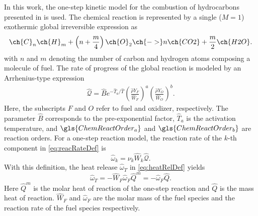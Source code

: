In this work,  the one-step kinetic model for the combustion of hydrocarbons presented in \textcite{fernandez-tarrazoSimpleOnestepChemistry2006} is used. The chemical reaction is represented by a single ($M = 1$)  exothermic global irreversible expression as
\begin{equation}
	\ch{C}_n \ch{H}_m + \left(n+\frac{m}{4}\right) \ch{O}_2\ch{ -> } n \ch{CO2} + \frac{m}{2} \ch{H2O}.
\end{equation}
with $n$ and $m$ denoting the number of carbon and hydrogen atoms composing a molecule of fuel. The rate of progress of the global reaction is modeled by an Arrhenius-type expression
\begin{align}
	\hat{\mathcal{Q}}= \hat B e^{-\hat T_a/\hat T} \left(\frac{\hat \rho Y_F}{\hat W_F}\right)^a \left(\frac{\hat \rho Y_O}{\hat W_O}\right)^b . \label{eq:DimArr}
\end{align}%
Here, the subscripts $F$ and $O$ refer to fuel and oxidizer, respectively. The parameter $\hat{B}$ corresponds to the pre-exponential factor, $\hat T_a$ is the activation temperature, and $\gls{ChemReactOrder_a}$ and $\gls{ChemReactOrder_b}$ are reaction orders. For a one-step reaction model, the reaction rate of the $k$-th component in \cref{eq:reacRateDef} is
\begin{equation}
	\hat \omega_k  =  \nu_{k} \hat W_k\hat{\mathcal{Q}}.
\end{equation}
With this definition, the heat release $\hat \omega_T$ in \cref{eq:heatRelDef} yields
\begin{equation}
	\hat \omega_T = - \hat W_F \hat \omega_F\hat Q^m = - \hat \omega_F\hat Q .
\end{equation}
Here $\hat Q^m$ is the molar heat of reaction of the one-step reaction and $\hat Q$ is the mass heat of reaction. $\hat W_F$ and $ \hat \omega_F$ are the molar mass of the fuel species and the reaction rate of the fuel species respectively.

